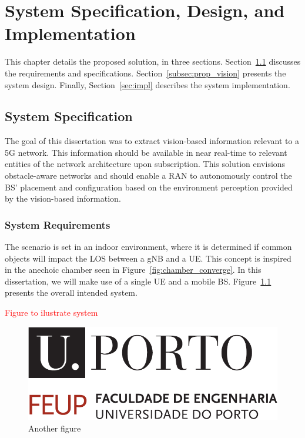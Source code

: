 \chapter{System Specification, Design, and Implementation}\label{ch:specs_design_implem}

This chapter details the proposed solution, in three sections.
Section~\ref{sec:specs} discusses the requirements and specifications.
Section~\ref{subsec:prop_vision} presents the system design.
Finally, Section~\ref{sec:impl} describes the system implementation.

\section{System Specification}\label{sec:specs}
The goal of this dissertation was to extract vision-based information relevant to a 5G network.
This information should be available in near real-time to relevant entities of the network architecture upon subscription.
This solution envisions obstacle-aware networks and should enable a RAN to autonomously control the BS' placement and configuration based on the environment perception provided by the vision-based information.

\subsection{System Requirements}\label{subsec:system-requirements}

The scenario is set in an indoor environment, where it is determined if common objects will impact the LOS between a gNB and a UE\@.
This concept is inspired in the anechoic chamber seen in Figure~\ref{fig:chamber_converge}.
In this dissertation, we will make use of a single UE and a mobile BS\@.
Figure~\ref{fig:my_chamber} presents the overall intended system.

\textcolor{red}{Figure to ilustrate system}
\begin{figure}[H]
    \centering
    \includegraphics[width=0.7\linewidth]{figures/uporto-feup}
    \caption[Another figure]{Another figure}
    \label{fig:my_chamber}
\end{figure}

